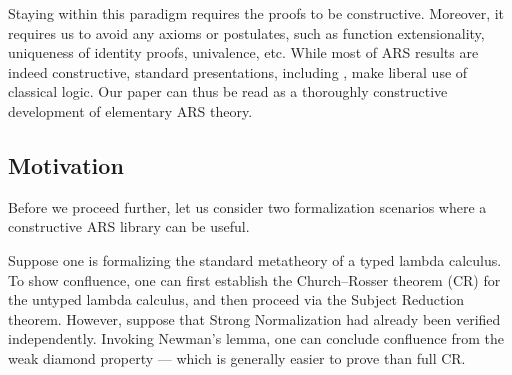 Staying within this paradigm requires the proofs to be constructive.
Moreover, it requires us to avoid any axioms or postulates, such as function
extensionality, uniqueness of identity proofs, univalence, etc.
While most of ARS results are indeed constructive, standard presentations,
 including \cite{Terese}, make liberal use of classical logic.
Our paper can thus be read as a thoroughly constructive
development of elementary ARS theory.

\subsection{Motivation}

Before we proceed further, let us consider two formalization scenarios where
a constructive ARS library can be useful.

\begin{example}
Suppose one is formalizing the standard metatheory of
a typed lambda calculus.  To show confluence, one can
first establish the Church--Rosser theorem (CR) for the untyped lambda calculus,
and then proceed via the Subject Reduction theorem.
However, suppose that Strong Normalization had already been verified independently.
Invoking Newman's lemma, one can conclude confluence from the weak
diamond property --- which is generally easier to prove than full CR.
\end{example}

